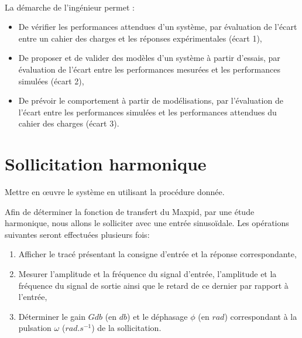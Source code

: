 

 \\

\graphicspath{{../../../img/}}
\begin{center}
\def\svgwidth{\columnwidth}

\end{center}

La démarche de l’ingénieur permet :
\begin{itemize}
 \item De vérifier les performances attendues d’un système, par évaluation de l’écart entre un cahier des charges et les réponses expérimentales (écart 1),
 \item De proposer et de valider des modèles d’un système à partir d’essais, par évaluation de l’écart entre les performances mesurées et les performances simulées (écart 2),
 \item De prévoir le comportement à partir de modélisations, par l’évaluation de l’écart entre les performances simulées et les performances attendues du cahier des charges (écart 3).
\end{itemize}



\newpage

\section{Sollicitation harmonique}

Mettre en \oe uvre le système en utilisant la procédure donnée.

Afin de déterminer la fonction de transfert du Maxpid, par une étude harmonique, nous allons le solliciter avec une entrée sinusoïdale. Les opérations suivantes seront effectuées plusieurs fois:
\begin{enumerate}
 \item Afficher le tracé présentant la consigne d'entrée et la réponse correspondante,
 \item Mesurer l'amplitude et la fréquence du signal d'entrée, l'amplitude et la fréquence du signal de sortie ainsi que le retard de ce dernier par rapport à l'entrée,
 \item Déterminer le gain $Gdb$ (en $db$) et le déphasage $\phi$ (en $rad$) correspondant à la pulsation $\omega$ ($rad.s^{-1}$) de la sollicitation.
\end{enumerate}


